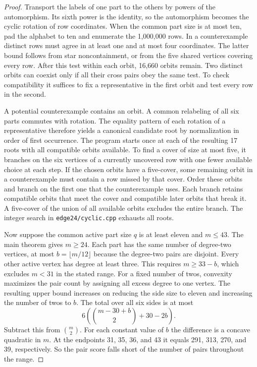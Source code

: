 \begin{proof}
Transport the labels of one part to the others by powers of the
automorphism. Its sixth power is the identity, so the automorphism
becomes the cyclic rotation of row coordinates. When the common
part size is at most ten, pad the alphabet to ten and enumerate the
1,000,000 rows. In a counterexample distinct rows must agree in at
least one and at most four coordinates. The latter bound follows
from star noncontainment, or from the five shared vertices covering
every row. After this test within each orbit, 16,660 orbits remain.
Two distinct orbits can coexist only if all their cross pairs obey the
same test. To check compatibility it suffices to fix a representative
in the first orbit and test every row in the second.

A potential counterexample contains an orbit. A common relabeling of
all six parts commutes with rotation. The equality pattern of each
rotation of a representative therefore yields a canonical candidate
root by normalization in order of first occurrence. The program
starts once at each of the resulting 17 roots with all compatible
orbits available. To find a cover of size at most five, it branches
on the six vertices of a currently uncovered row with one fewer
available choice at each step. If the chosen orbits have a five-cover,
some remaining orbit in a counterexample must contain a row missed
by that cover. Order these orbits and branch on the first one that the
counterexample uses. Each branch retains compatible orbits that meet
the cover and compatible later orbits that break it. A five-cover of
the union of all available orbits excludes the entire branch.
The integer search in \texttt{edge24/cyclic.cpp} exhausts all roots.

Now suppose the common active part size $q$ is at least eleven and
$m\le43$. The main theorem gives $m\ge24$. Each part has the same
number of degree-two vertices, at most $b=\lfloor m/12\rfloor$ because
the degree-two pairs are disjoint. Every other active vertex has
degree at least three. This requires $m\ge33-b$, which excludes
$m<31$ in the stated range. For a fixed number of twos, convexity
maximizes the pair count by assigning all excess degree to one
vertex. The resulting upper bound increases on reducing the side
size to eleven and increasing the number of twos to $b$. The total
over all six sides is at most
\[
 6\left(\binom{m-30+b}{2}+30-2b\right).
\]
Subtract this from $\binom m2$. For each constant value of $b$ the
difference is a concave quadratic in $m$. At the endpoints 31, 35,
36, and 43 it equals 291, 313, 270, and 39, respectively. So the
pair score falls short of the number of pairs throughout the range.
\end{proof}

